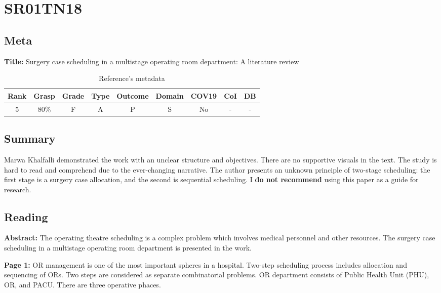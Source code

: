 \section{ SR01TN18 }


\subsection{Meta}

    \textbf{Title:}
    Surgery case scheduling in a multistage operating room department: A literature review

    \begin{table}[H]
        \centering
        \begin{tabular}{|c|c|c|c|c|c|c|c|c|}
            \hline
                \textbf{Rank} & \textbf{Grasp} & \textbf{Grade} & \textbf{Type} & \textbf{Outcome} & \textbf{Domain} & \textbf{COV19} & \textbf{CoI} & \textbf{DB} \\
            \hline
                5 & 80\% & F & A & P & S & No & - & - \\
            \hline
        \end{tabular}
        \caption{Reference's metadata}
        \label{tab:SR01TN18}
    \end{table}

\subsection{Summary}
    Marwa Khalfalli \cite{x104} demonstrated the work with an unclear structure and objectives. There are no supportive visuals in the text. The study is hard to read and comprehend due to the ever-changing narrative. The author presents an unknown principle of two-stage scheduling: the first stage is a surgery case allocation, and the second is sequential scheduling. I \textbf{do not recommend} using this paper as a guide for research.

\subsection{Reading}
    \textbf{Abstract:}
    The operating theatre scheduling is a complex problem which involves medical personnel and other resources. The surgery case scheduling in a multistage operating room department is presented in the work.

    \textbf{Page 1:}
    OR management is one of the most important spheres in a hospital. Two-step scheduling process includes allocation and sequencing of ORs. Two steps are considered as separate combinatorial problems. OR department consists of Public Health Unit (PHU), OR, and PACU. There are three operative phaces. 
    
